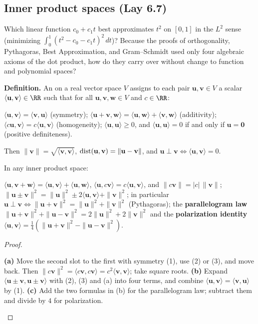 \documentclass[10pt]{scrartcl}
\newcommand{\vv}[1]{\mathbf{#1}}
\newcommand{\ip}[2]{\langle #1,#2\rangle}
\begin{document}
\subsection{Inner product spaces (Lay 6.7)}

\begin{qbox}
  Which linear function $c_0+c_1t$ best approximates $t^2$ on $[0,1]$ in the $L^2$ sense (minimizing $\int_0^1 (t^2-c_0-c_1t)^2\,dt$)? Because the proofs of orthogonality, Pythagoras, Best Approximation, and Gram--Schmidt used only four algebraic axioms of the dot product, how do they carry over without change to function and polynomial spaces?
\end{qbox}

\noindent\textbf{Definition.} An  on a real vector space $V$ assigns to each pair $\vv u,\vv v\in V$ a scalar $\ip{\vv u}{\vv v}\in\RR$ such that for all $\vv u,\vv v,\vv w\in V$ and $c\in\RR$:
\begin{enumerate}
  \ii[(1)] $\ip{\vv u}{\vv v}=\ip{\vv v}{\vv u}$ \quad (symmetry);
  \ii[(2)] $\ip{\vv u+\vv v}{\vv w}=\ip{\vv u}{\vv w}+\ip{\vv v}{\vv w}$ \quad (additivity);
  \ii[(3)] $\ip{c\vv u}{\vv v}=c\ip{\vv u}{\vv v}$ \quad (homogeneity);
  \ii[(4)] $\ip{\vv u}{\vv u}\ge 0$, and $\ip{\vv u}{\vv u}=0$ if and only if $\vv u=\vv 0$ \quad (positive definiteness).
\end{enumerate}
Then $\|\vv v\|=\sqrt{\ip{\vv v}{\vv v}}$, $\dist(\vv u,\vv v)=\|\vv u-\vv v\|$, and $\vv u\perp\vv v \iff \ip{\vv u}{\vv v}=0$.

\begin{proposition*}
  In any inner product space:
  \begin{enumerate}
    \ii[(a)] $\ip{\vv u}{\vv v+\vv w}=\ip{\vv u}{\vv v}+\ip{\vv u}{\vv w}$, $\ip{\vv u}{c\vv v}=c\ip{\vv u}{\vv v}$, and $\|c\vv v\|=|c|\,\|\vv v\|$;
    \ii[(b)] $\|\vv u\pm\vv v\|^2=\|\vv u\|^2\pm 2\ip{\vv u}{\vv v}+\|\vv v\|^2$; in particular $\vv u\perp\vv v\iff\|\vv u+\vv v\|^2=\|\vv u\|^2+\|\vv v\|^2$ (Pythagoras);
    \ii[(c)] the \textbf{parallelogram law} $\|\vv u+\vv v\|^2+\|\vv u-\vv v\|^2=2\|\vv u\|^2+2\|\vv v\|^2$ and the \textbf{polarization identity} $\ip{\vv u}{\vv v}=\frac14(\|\vv u+\vv v\|^2-\|\vv u-\vv v\|^2)$.
  \end{enumerate}
\end{proposition*}
\begin{proof}
  \begin{steps}
    \ii \textbf{(a)} Move the second slot to the first with symmetry (1), use (2) or (3), and move back. Then $\|c\vv v\|^2=\ip{c\vv v}{c\vv v}=c^2\ip{\vv v}{\vv v}$; take square roots.
    \ii \textbf{(b)} Expand $\ip{\vv u\pm\vv v}{\vv u\pm\vv v}$ with (2), (3) and (a) into four terms, and combine $\ip{\vv u}{\vv v}=\ip{\vv v}{\vv u}$ by (1).
    \ii \textbf{(c)} Add the two formulas in (b) for the parallelogram law; subtract them and divide by $4$ for polarization. \qedhere
  \end{steps}
\end{proof}
\end{document}
